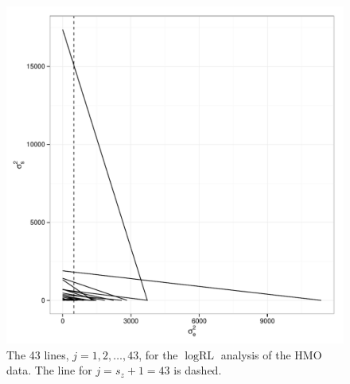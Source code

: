 \documentclass{report}
\newcommand{\RLorig}{\text{RL}}
\newcommand{\logRLorig}{\log\RLorig}
\begin{document}
\begin{figure}
	\centering
	\includegraphics[width=.45\linewidth]{figs/hmo_HH11_lines.pdf}
	\caption{The 43 lines, $j=1, 2, \dots, 43$, for the $\logRLorig$ analysis of the HMO data.
	              The line for $j = s_z+1 = 43$ is dashed.}
	\label{fig:hmolines}
\end{figure}
\end{document}
